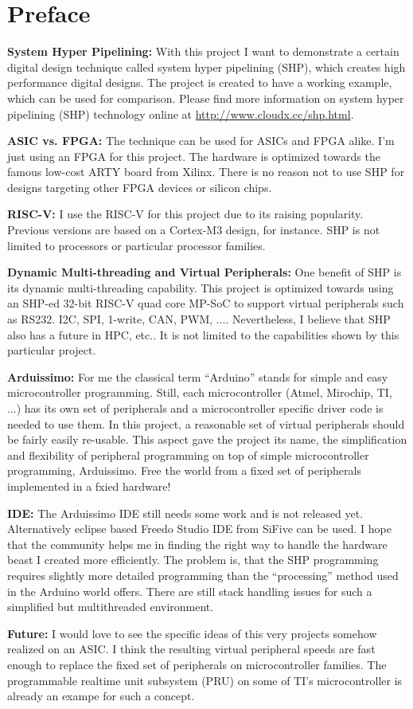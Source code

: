\chapter{Preface}

\textbf{System Hyper Pipelining:} With this project I want to demonstrate a certain digital design technique called system hyper pipelining (SHP), which creates high performance digital designs. The project is created to have a working example, which can be used for comparison. Please find more information on system hyper pipelining (SHP) technology online at \url{http://www.cloudx.cc/shp.html}.

\textbf{ASIC vs. FPGA:} The technique can be used for ASICs and FPGA alike. I'm just using an FPGA for this project. The hardware is optimized towards the famous low-cost ARTY board from Xilinx. There is no reason not to use SHP for designs targeting other FPGA devices or silicon chips.

\textbf{RISC-V:} I use the RISC-V for this project due to its raising popularity. Previous versions are based on a Cortex-M3 design, for instance. SHP is not limited to processors or particular processor families.

\textbf{Dynamic Multi-threading and Virtual Peripherals:} One benefit of SHP is its dynamic multi-threading capability. This project is optimized towards using an SHP-ed 32-bit RISC-V quad core MP-SoC to support virtual peripherals such as RS232. I2C, SPI, 1-write, CAN, PWM, .... Nevertheless, I believe that SHP also has a future in HPC, etc.. It is not limited to the capabilities shown by this particular project.

\textbf{Arduissimo:} For me the classical term “Arduino” stands for simple and easy microcontroller programming. Still, each microcontroller (Atmel, Mirochip, TI, ...) has its own set of peripherals and a microcontroller specific driver code is needed to use them. In this project, a reasonable set of virtual peripherals should be fairly easily re-usable. This aspect gave the project its name, the simplification and flexibility of peripheral programming on top of simple microcontroller programming, Arduissimo. Free the world from a fixed set of peripherals implemented in a fxied hardware! 

\textbf{IDE:} The Arduissimo IDE still needs some work and is not released yet. Alternatively eclipse based Freedo Studio IDE from SiFive can be used. I hope that the community helps me in finding the right way to handle the hardware beast I created more efficiently. The problem is, that the SHP programming requires slightly more detailed programming than the “processing” method used in the Arduino world offers. There are still stack handling issues for such a simplified but multithreaded environment.

\textbf{Future:} I would love to see the specific ideas of this very projects somehow realized on an ASIC. I think the resulting virtual peripheral speeds are fast enough to replace the fixed set of peripherals on microcontroller families. The programmable realtime unit subsystem (PRU) on some of TI's microcontroller is already an exampe for such a concept.  
